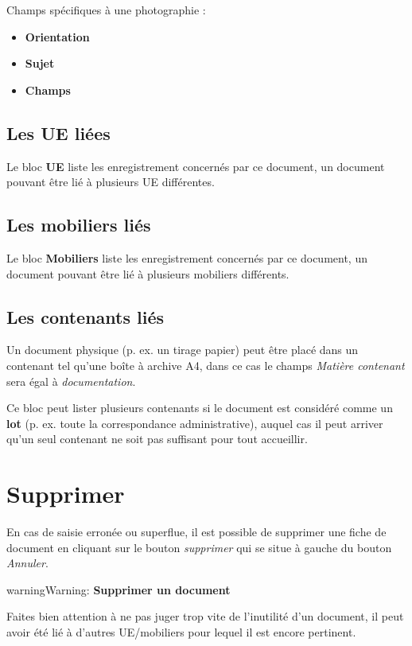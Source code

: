 \documentclass[letterpaper,10pt,french]{sphinxmanual}
\begin{document}
Champs spécifiques à une photographie :
\begin{itemize}
\item {} 
\textbf{Orientation}

\item {} 
\textbf{Sujet}

\item {} 
\textbf{Champs}

\end{itemize}


\subsection{Les UE liées}
\label{manuel/formulaire_documentation:les-ue-liees}
Le bloc \textbf{UE} liste les enregistrement concernés par ce document, un document pouvant être lié à plusieurs UE différentes.


\subsection{Les mobiliers liés}
\label{manuel/formulaire_documentation:les-mobiliers-lies}
Le bloc \textbf{Mobiliers} liste les enregistrement concernés par ce document, un document pouvant être lié à plusieurs mobiliers différents.


\subsection{Les contenants liés}
\label{manuel/formulaire_documentation:les-contenants-lies}
Un document physique (p. ex. un tirage papier) peut être placé dans un contenant tel qu'une boîte à archive A4, dans ce cas le champs \emph{Matière contenant} sera égal à \emph{documentation}.

Ce bloc peut lister plusieurs contenants si le document est considéré comme un \textbf{lot} (p. ex. toute la correspondance administrative), auquel cas il peut arriver qu'un seul contenant ne soit pas suffisant pour tout accueillir.


\section{Supprimer}
\label{manuel/formulaire_documentation:supprimer}
En cas de saisie erronée ou superflue, il est possible de supprimer une fiche de document en cliquant sur le bouton \emph{supprimer} qui se situe à gauche du bouton \emph{Annuler}.

\begin{notice}{warning}{Warning:}
\textbf{Supprimer un document}

Faites bien attention à ne pas juger trop vite de l'inutilité d'un document, il peut avoir été lié à d'autres UE/mobiliers pour lequel il est encore pertinent.
\end{notice}
\end{document}
